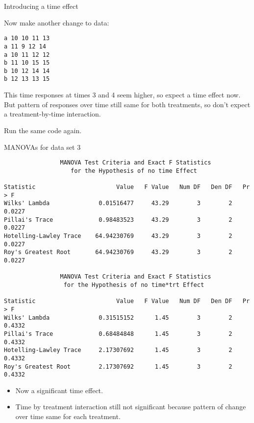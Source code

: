 \documentclass[pdf]{prosper}
\begin{document}
\begin{slide}{Introducing a time effect}

Now make another change to data:

\begin{verbatim}
a 10 10 11 13
a 11 9 12 14
a 10 11 12 12
b 11 10 15 15
b 10 12 14 14
b 12 13 13 15
\end{verbatim}

This time responses at times 3 and 4 seem higher, so expect a time effect now. But pattern of responses over time still same for both treatments, so don't expect a treatment-by-time interaction.

\vspace{3ex}

Run the same code again.
    
  \end{slide}

  \begin{slide}{MANOVAs for data set 3}

{\scriptsize
\begin{verbatim}
                MANOVA Test Criteria and Exact F Statistics
                   for the Hypothesis of no time Effect
 
Statistic                       Value   F Value   Num DF   Den DF   Pr > F
Wilks' Lambda              0.01516477     43.29        3        2   0.0227
Pillai's Trace             0.98483523     43.29        3        2   0.0227
Hotelling-Lawley Trace    64.94230769     43.29        3        2   0.0227
Roy's Greatest Root       64.94230769     43.29        3        2   0.0227

                MANOVA Test Criteria and Exact F Statistics
                 for the Hypothesis of no time*trt Effect
 
Statistic                       Value   F Value   Num DF   Den DF   Pr > F
Wilks' Lambda              0.31515152      1.45        3        2   0.4332
Pillai's Trace             0.68484848      1.45        3        2   0.4332
Hotelling-Lawley Trace     2.17307692      1.45        3        2   0.4332
Roy's Greatest Root        2.17307692      1.45        3        2   0.4332

\end{verbatim}
}

\begin{itemize}
\item Now a significant time effect.
\item Time by treatment interaction still not significant because pattern of change over time same for each treatment.
\end{itemize}
    
  \end{slide}
\end{document}
